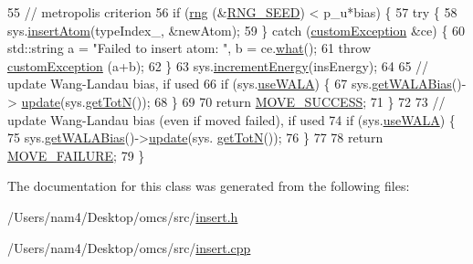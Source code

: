 \begin{DoxyCode}
55                 \textcolor{comment}{// metropolis criterion}
56                 \textcolor{keywordflow}{if} (\hyperlink{utilities_8cpp_a0f9542af4b475ac79cb679d7a8d14db0}{rng} (&\hyperlink{global_8h_a3f4e4ea24d5a5c66feae55d1f329c884}{RNG\_SEED}) < p\_u*bias) \{
57         \textcolor{keywordflow}{try} \{
58             sys.\hyperlink{classsim_system_a6c1e86f585f3a52aa82b6394ffbf1c6a}{insertAtom}(typeIndex\_, &newAtom);
59         \} \textcolor{keywordflow}{catch} (\hyperlink{classcustom_exception}{customException} &ce) \{
60             std::string a = \textcolor{stringliteral}{"Failed to insert atom: "}, b = ce.\hyperlink{classcustom_exception_aeb6ab5848b038adfc68fde86a512f691}{what}();
61             \textcolor{keywordflow}{throw} \hyperlink{classcustom_exception}{customException} (a+b);
62         \}
63                                 sys.\hyperlink{classsim_system_a6ad31c08955b80873f865b3069618dcb}{incrementEnergy}(insEnergy);
64                                 
65                                 \textcolor{comment}{// update Wang-Landau bias, if used}
66                                 \textcolor{keywordflow}{if} (sys.\hyperlink{classsim_system_aa83b00006b3919fb6e13f1bdeadece6a}{useWALA}) \{
67                                                 sys.\hyperlink{classsim_system_a7cb5049de8b0988349e89e30e4000407}{getWALABias}()->
      \hyperlink{classwala_a5eb2622be6a9e89f5e59ba0b15aca4bd}{update}(sys.\hyperlink{classsim_system_a37dd827f4057049763351510147b9f1d}{getTotN}());
68                                 \}
69                                 
70         \textcolor{keywordflow}{return} \hyperlink{moves_8h_ae8285cbddc5d21f73f49dcbad82a775a}{MOVE\_SUCCESS};
71     \}
72     
73                 \textcolor{comment}{// update Wang-Landau bias (even if moved failed), if used}
74                 \textcolor{keywordflow}{if} (sys.\hyperlink{classsim_system_aa83b00006b3919fb6e13f1bdeadece6a}{useWALA}) \{
75                                 sys.\hyperlink{classsim_system_a7cb5049de8b0988349e89e30e4000407}{getWALABias}()->\hyperlink{classwala_a5eb2622be6a9e89f5e59ba0b15aca4bd}{update}(sys.
      \hyperlink{classsim_system_a37dd827f4057049763351510147b9f1d}{getTotN}());
76                 \}
77                 
78                 \textcolor{keywordflow}{return} \hyperlink{moves_8h_a9832cf5fcfa8c0894545b591c9908e39}{MOVE\_FAILURE};
79 \}
\end{DoxyCode}


The documentation for this class was generated from the following files\+:\begin{DoxyCompactItemize}
\item 
/\+Users/nam4/\+Desktop/omcs/src/\hyperlink{insert_8h}{insert.\+h}\item 
/\+Users/nam4/\+Desktop/omcs/src/\hyperlink{insert_8cpp}{insert.\+cpp}\end{DoxyCompactItemize}
